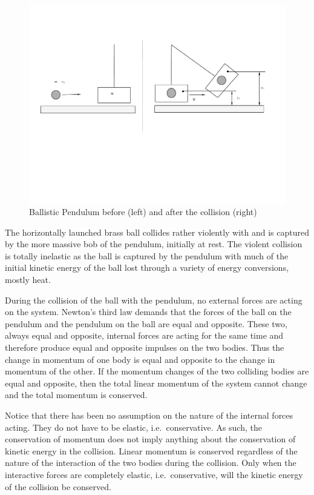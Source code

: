 \begin{figure}
  \begin{center}
    \includegraphics[width=5in]{Experiment05Figures/Figure01a.pdf}
  \end{center}
  \caption{Ballistic Pendulum before (left) and after the collision (right)}
  \label{M06Fig01}  %
\end{figure}

The horizontally launched brass ball collides rather violently with and is captured by the more massive bob of the pendulum, initially at rest.  The violent collision is totally inelastic as the ball is captured by the pendulum with much of the initial kinetic energy of the ball lost through a variety of energy conversions, mostly heat.

During the collision of the ball with the pendulum, no external forces are acting on the system.  Newton's third law demands that the forces of the ball on the pendulum and the pendulum on the ball are equal and opposite.  These two, always equal and opposite, internal forces are acting for the same time and therefore produce equal and opposite impulses on the two bodies. Thus the change in momentum of one body is equal and opposite to the change in momentum of the other.  If the momentum changes of the two colliding bodies are equal and opposite, then the total linear momentum of the system cannot change and the total momentum is conserved.

Notice that there has been no assumption on the nature of the internal forces acting.  They do not have to be elastic, i.e.\ conservative.  As such, the conservation of momentum does not imply anything about the conservation of kinetic energy in the collision.  Linear momentum is conserved regardless of the nature of the interaction of the two bodies during the collision.  Only when the interactive forces are completely elastic, i.e.\ conservative, will the kinetic energy of the collision be conserved.

